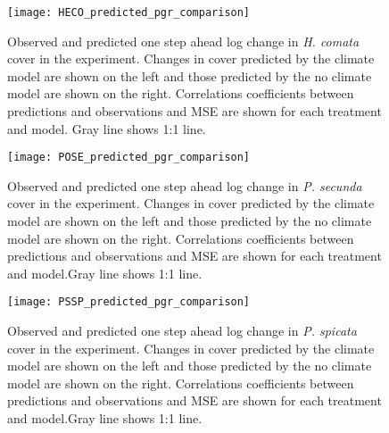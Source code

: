 \documentclass[11pt]{article}
\begin{document}
\begin{figure}[!htbp]
	\centering
	\texttt{[image: HECO\_predicted\_pgr\_comparison]}
	\caption{Observed and predicted one step ahead log change in \textit{H. comata} cover in the experiment. Changes in cover predicted by the climate model are shown on the left and those predicted by the no climate model are shown on the right. Correlations coefficients between predictions and observations and MSE are shown for each treatment and model. Gray line shows 1:1 line.}
	\label{fig:pgrHECO}
\end{figure}

\begin{figure}[!htbp]
	\centering
	\texttt{[image: POSE\_predicted\_pgr\_comparison]}
	\caption{Observed and predicted one step ahead log change in \textit{P. secunda} cover in the experiment. Changes in cover predicted by the climate model are shown on the left and those predicted by the no climate model are shown on the right. Correlations coefficients between predictions and observations and MSE are shown for each treatment and model.Gray line shows 1:1 line.}
	\label{fig:pgrPOSE}
\end{figure}

\begin{figure}[!htbp]
	\centering
	\texttt{[image: PSSP\_predicted\_pgr\_comparison]}
	\caption{Observed and predicted one step ahead log change in \textit{P. spicata} cover in the experiment. Changes in cover predicted by the climate model are shown on the left and those predicted by the no climate model are shown on the right. Correlations coefficients between predictions and observations and MSE are shown for each treatment and model.Gray line shows 1:1 line.}
	\label{fig:pgrPSSP}
\end{figure}




\clearpage 
\newpage 



\clearpage 
\newpage 

\setcounter{page}{1}
\setcounter{equation}{0}
\setcounter{figure}{0}
\setcounter{section}{0}
\setcounter{table}{0}
\renewcommand{\theequation}{A.\arabic{equation}}
\renewcommand{\thetable}{A-\arabic{table}}
\renewcommand{\thefigure}{A-\arabic{figure}}
\renewcommand{\thesection}{Section A.\arabic{section}}
\end{document}
